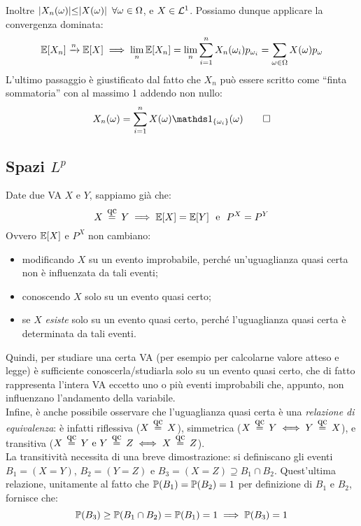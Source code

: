 \begin{ese}
\begin{dimo}
  Inoltre $\lvert X_n (\omega)\lvert \le \rvert X(\omega)\rvert \enspace \forall \omega \in \Omega$, e $X \in \mathcal L^1$.
  Possiamo dunque applicare la convergenza dominata:
  $$
    \mathbb E[X_n] \xrightarrow{n} \mathbb E[X] \implies \lim\limits_{n} \mathbb E[X_n]
    = \lim\limits_{n} \sum_{i=1}^{n} X_n (\omega_i) p_{\omega_i} = \sum_{\omega \in \Omega} X(\omega) p_\omega
  $$
  L'ultimo passaggio è giustificato dal fatto che $X_n$ può essere scritto come ``finta sommatoria'' con al massimo 1 addendo non nullo:
  $$
    X_n (\omega) = \sum_{i=1}^{n} X(\omega) \Ind_{\{\omega_i\}} (\omega) \qedhere
  $$
  \end{dimo}
\end{ese}

\subsection{Spazi $L^p$}
\begin{oss}
  Date due VA $X$ e $Y$, sappiamo già che:
  $$
    X \aceq Y \implies \EE[X] = \EE[Y] \ \ \text{e} \ \ P^X = P^Y
  $$
  Ovvero $\mathbb E[X]$ e $P^X$ non cambiano:
  \begin{itemize}
    \item modificando $X$ su un evento improbabile, perché un'uguaglianza quasi certa non è influenzata da tali eventi;
    \item conoscendo $X$ solo su un evento quasi certo;
    \item se $X$ \emph{esiste} solo su un evento quasi certo, perché l'uguaglianza quasi certa è determinata da tali eventi.
  \end{itemize}
  Quindi, per studiare una certa VA (per esempio per calcolarne valore atteso e legge) è sufficiente conoscerla/studiarla solo su un evento quasi certo, che di fatto rappresenta l'intera VA eccetto uno o più eventi improbabili che, appunto, non influenzano l'andamento della variabile. \\
  Infine, è anche possibile osservare che l'uguaglianza quasi certa è una \emph{relazione di equivalenza}: è infatti riflessiva ($X \aceq X$), simmetrica ($X \aceq Y \iff Y \aceq X$), e transitiva ($X \aceq Y \text{ e } Y \aceq Z \iff X \aceq Z$). \\
  La transitività necessita di una breve dimostrazione: 
  si definiscano gli eventi $B_1 = (X=Y)$, $B_2 = (Y=Z)$ e $B_3 = (X=Z) \supseteq B_1 \cap B_2$. Quest'ultima relazione, unitamente al fatto che $\mathbb P(B_1) =\mathbb P(B_2) = 1$ per definizione di $B_1$ e $B_2$, fornisce che:
  $$
    \mathbb P(B_3) \ge \mathbb P(B_1 \cap B_2) = \mathbb P(B_1) = 1 \implies \mathbb P(B_3) = 1
  $$
\end{oss}

